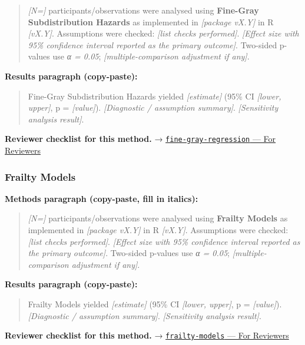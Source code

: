 \documentclass[
]{article}
\begin{document}
\begin{quote}
\emph{{[}N={]}} participants/observations were analysed using
\textbf{Fine-Gray Subdistribution Hazards} as implemented in
\emph{{[}package vX.Y{]}} in R \emph{{[}vX.Y{]}}. Assumptions were
checked: \emph{{[}list checks performed{]}}. \emph{{[}Effect size with
95\% confidence interval reported as the primary outcome{]}}. Two-sided
p-values use \emph{α = 0.05}; \emph{{[}multiple-comparison adjustment if
any{]}}.
\end{quote}

\textbf{Results paragraph (copy-paste):}

\begin{quote}
Fine-Gray Subdistribution Hazards yielded \emph{{[}estimate{]}} (95\% CI
\emph{{[}lower, upper{]}}, p = \emph{{[}value{]}}). \emph{{[}Diagnostic
/ assumption summary{]}}. \emph{{[}Sensitivity analysis result{]}}.
\end{quote}

\textbf{Reviewer checklist for this method.} →
\href{../chapters/11-survival/fine-gray-regression.Rmd\#for-reviewers}{\texttt{fine-gray-regression}
--- For Reviewers}

\subsubsection{Frailty Models}\label{frailty-models}

\textbf{Methods paragraph (copy-paste, fill in italics):}

\begin{quote}
\emph{{[}N={]}} participants/observations were analysed using
\textbf{Frailty Models} as implemented in \emph{{[}package vX.Y{]}} in R
\emph{{[}vX.Y{]}}. Assumptions were checked: \emph{{[}list checks
performed{]}}. \emph{{[}Effect size with 95\% confidence interval
reported as the primary outcome{]}}. Two-sided p-values use \emph{α =
0.05}; \emph{{[}multiple-comparison adjustment if any{]}}.
\end{quote}

\textbf{Results paragraph (copy-paste):}

\begin{quote}
Frailty Models yielded \emph{{[}estimate{]}} (95\% CI \emph{{[}lower,
upper{]}}, p = \emph{{[}value{]}}). \emph{{[}Diagnostic / assumption
summary{]}}. \emph{{[}Sensitivity analysis result{]}}.
\end{quote}

\textbf{Reviewer checklist for this method.} →
\href{../chapters/11-survival/frailty-models.Rmd\#for-reviewers}{\texttt{frailty-models}
--- For Reviewers}
\end{document}
